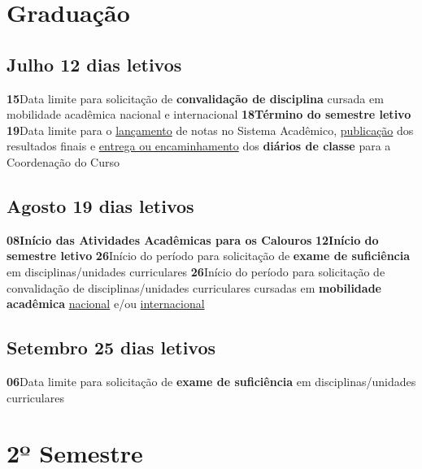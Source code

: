 \documentclass[thesis]{hmcposter}
\begin{document}
\begin{poster}
\section{\color{hmcorange}Graduação}\subsection{Julho \hfill 12 dias letivos}\textbf{15}\qquad Data limite para solicitação de \textbf{convalidação de disciplina} cursada em mobilidade acadêmica nacional e internacional \newline \null\textbf{18}\qquad \textbf{Término do semestre letivo} \newline \null\textbf{19}\qquad Data limite para o \underline{lançamento} de notas no Sistema Acadêmico, \underline{publicação} dos resultados finais e \underline{entrega ou encaminhamento} dos \textbf{diários de classe} para a Coordenação do Curso \newline \null\subsection{Agosto \hfill 19 dias letivos}\textbf{08}\qquad \textbf{Início das Atividades Acadêmicas para os Calouros} \newline \null\textbf{12}\qquad \textbf{Início do semestre letivo} \newline \null\textbf{26}\qquad Início do período para solicitação de \textbf{exame de suficiência} em disciplinas/unidades curriculares \newline \null\textbf{26}\qquad Início do período para solicitação de convalidação de disciplinas/unidades curriculares cursadas em \textbf{mobilidade acadêmica} \underline{nacional} e/ou \underline{internacional} \newline \null\subsection{Setembro \hfill 25 dias letivos}\textbf{06}\qquad Data limite para solicitação de \textbf{exame de suficiência} em disciplinas/unidades curriculares \newline \null\vfill\null
\columnbreak
\section{\hfill \color{hmcorange}2º Semestre}

\end{poster}
\end{document}
